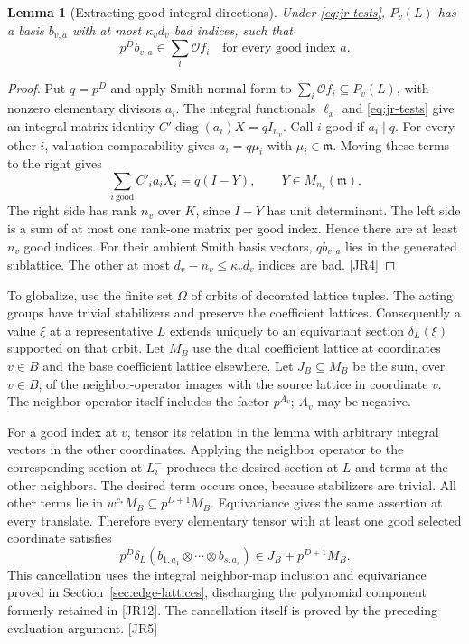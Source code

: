 \documentclass[11pt,a4paper]{article}
\numberwithin{equation}{section}
\newtheorem{lemma}[theorem]{Lemma}
\theoremstyle{remark}\newtheorem{remark}[theorem]{Remark}
\begin{document}
\begin{lemma}[Extracting good integral directions]\label{lem:jr-smith}
Under \eqref{eq:jr-tests}, $P_v(L)$ has a basis $b_{v,a}$ with at most $\kappa_vd_v$ bad indices, such that
\[
 p^D b_{v,a}\in\sum_i\mathcal O f_i
 \quad\text{for every good index }a.
\]
\end{lemma}
\begin{proof}
Put $q=p^D$ and apply Smith normal form to $\sum_i\mathcal O f_i\subseteq P_v(L)$, with nonzero elementary divisors $a_i$. The integral functionals $\ell_x$ and \eqref{eq:jr-tests} give an integral matrix identity $C'\operatorname{diag}(a_i)X=qI_{n_v}$. Call $i$ good if $a_i\mid q$. For every other $i$, valuation comparability gives $a_i=q\mu_i$ with $\mu_i\in\mathfrak m$. Moving these terms to the right gives
\[
 \sum_{i\ \mathrm{good}} C'_i a_i X_i=q(I-Y),
 \qquad Y\in M_{n_v}(\mathfrak m).
\]
The right side has rank $n_v$ over $K$, since $I-Y$ has unit determinant. The left side is a sum of at most one rank-one matrix per good index. Hence there are at least $n_v$ good indices. For their ambient Smith basis vectors, $q b_{v,a}$ lies in the generated sublattice. The other at most $d_v-n_v\le\kappa_vd_v$ indices are bad. \textsf{[JR4]}
\end{proof}

To globalize, use the finite set $\Omega$ of orbits of decorated lattice tuples. The acting groups have trivial stabilizers and preserve the coefficient lattices. Consequently a value $\xi$ at a representative $L$ extends uniquely to an equivariant section $\delta_L(\xi)$ supported on that orbit. Let $M_B$ use the dual coefficient lattice at coordinates $v\in B$ and the base coefficient lattice elsewhere. Let $J_B\subseteq M_B$ be the sum, over $v\in B$, of the neighbor-operator images with the source lattice in coordinate $v$. The neighbor operator itself includes the factor $p^{A_v}$; $A_v$ may be negative.

For a good index at $v$, tensor its relation in the lemma with arbitrary integral vectors in the other coordinates. Applying the neighbor operator to the corresponding section at $L_i^-$ produces the desired section at $L$ and terms at the other neighbors. The desired term occurs once, because stabilizers are trivial. All other terms lie in $w^{c_*}M_B\subseteq p^{D+1}M_B$. Equivariance gives the same assertion at every translate. Therefore every elementary tensor with at least one good selected coordinate satisfies
\begin{equation}\label{eq:jr-one-good}
 p^D\delta_L(b_{1,a_1}\otimes\cdots\otimes b_{s,a_s})
       \in J_B+p^{D+1}M_B.
\end{equation}
This cancellation uses the integral neighbor-map inclusion and equivariance proved in Section~\ref{sec:edge-lattices}, discharging the polynomial component formerly retained in \textsf{[JR12]}. The cancellation itself is proved by the preceding evaluation argument. \textsf{[JR5]}
\end{document}
